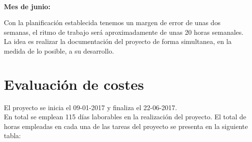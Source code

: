 \documentclass[12pt, a4paper]{book}
\def\GanttHeader#1#2#3#4{%
	\pgfmathparse{(#1-#2-#3)/#4}
	\tikzset{y=7mm, task number/.style={left, font=\bfseries},
		task description/.style={text width=#3,  right, draw=none,
			font=\sffamily, xshift=#2,
			minimum height=2em},
		gantt bar/.style={draw=black, fill=blue!30},
		help lines/.style={draw=black!30, dashed},
		x=\pgfmathresult pt
	}
	\def\totalmonths{#4}
	\node (Header) [task description] at (0,0) {\textbf{\large Tareas}};
	\begin{scope}[shift=($(Header.south east)$)]
		\foreach \x in {1,...,#4}
		\node[above] at (\x,0) {\footnotesize\x};
	\end{scope}
}
\def\Task#1#2#3#4{%
	\node[task number] at ($(Header.west) + (0, -#1)$) {#1};
	\node[task description] at (0,-#1) {#2};
	\begin{scope}[shift=($(Header.south east)$)]
		\draw (0,-#1) rectangle +(\totalmonths, 1);
		\foreach \x in {1,...,\totalmonths}
		\draw[help lines] (\x,-#1) -- +(0,1);
		\filldraw[gantt bar] ($(#3, -#1+0.2)$) rectangle +(#4,0.6);
	\end{scope}
}
\begin{document}
\begin{landscape}
	\\
	
	\textbf{Mes de junio:}\\
	
	
	
\end{landscape} 
\newpage


Con la planificación establecida tenemos un margen de error de unas dos semanas, el ritmo de trabajo será aproximadamente de unas 20 horas semanales.\\

La idea es realizar la documentación del proyecto de forma simultanea, en la medida de lo posible, a su desarrollo.

\section{Evaluación de costes}

El proyecto se inicia el 09-01-2017 y finaliza el 22-06-2017.\\

En total se emplean 115 días laborables en la realización del proyecto. El total de horas empleadas en cada una de las tareas del proyecto se presenta en la siguiente tabla: \\
\end{document}
